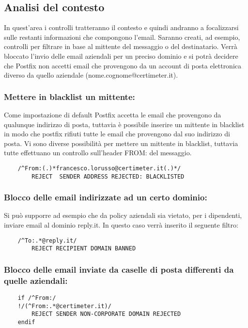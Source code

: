     \subsection{Analisi del contesto}
    In quest’area i controlli tratteranno il contesto e quindi andranno a focalizzarsi sulle restanti 
    informazioni che compongono l’email. Saranno creati, ad esempio, controlli per filtrare in base al 
    mittente del messaggio o del destinatario. 
    Verrà bloccato l’invio delle email aziendali per un preciso dominio e si potrà decidere che Postfix 
    non accetti email che provengono da un account di posta elettronica diverso da quello aziendale 
    (nome.cognome@certimeter.it). 

    \subsubsection{Mettere in blacklist un mittente:}
    Come impostazione di default Postfix accetta le email che provengono da qualunque indirizzo di posta, 
    tuttavia è possibile inserire un mittente in blacklist in modo che postfix rifiuti tutte le email che 
    provengono dal suo indirizzo di posta. Vi sono diverse possibilità per mettere un mittente in blacklist, 
    tuttavia tutte effettuano un controllo sull’header FROM: del messaggio.

    \begin{verbatim}
    /^From:(.)*francesco.lorusso@certimeter.it(.)*/
        REJECT  SENDER ADDRESS REJECTED: BLACKLISTED
    \end{verbatim}

    \subsubsection{Blocco delle email indirizzate ad un certo dominio:}
    Si può supporre ad esempio che da policy aziendali sia vietato, per i dipendenti, 
    inviare email al dominio reply.it.
    In questo caso verrà inserito il seguente filtro:

    \begin{verbatim}
    /^To:.*@reply.it/
        REJECT RECIPIENT DOMAIN BANNED
    \end{verbatim}

    \subsubsection{Blocco delle email inviate da caselle di posta differenti da quelle aziendali:}
    \begin{verbatim}
    if /^From:/
    !/(^From:.*@certimeter.it)/ 
        REJECT SENDER NON-CORPORATE DOMAIN REJECTED
    endif
    \end{verbatim}

